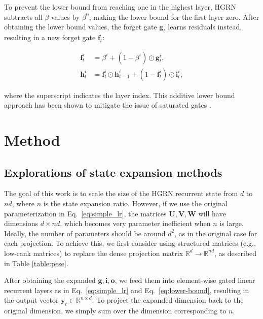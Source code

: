 To prevent the lower bound from reaching one in the highest layer, HGRN subtracts all \(\beta\) values by \(\beta^0\), making the lower bound for the first layer zero. After obtaining the lower bound values, the forget gate \(\mathbf{g}_t\) learns residuals instead, resulting in a new forget gate \(\mathbf{f}_t\):

\begin{equation}
    \begin{aligned}
    \mathbf{f}_t^{i} &=  \beta^{i} + (1 - \beta^i) \odot \mathbf{g}_t^i, \\
    \mathbf{h}_t^{i} &= \mathbf{f}_t^i \odot \mathbf{h}_{t-1}^i + (1 - \mathbf{f}_t^i) \odot \mathbf{i}_t^i,
    \end{aligned}
    \label{eq:lower-bound}
\end{equation}

where the superscript indicates the layer index. This additive lower bound approach has been shown to mitigate the issue of saturated gates \citep{DBLP:conf/icml/GuGP0P20}.

\section{Method}
\subsection{Explorations of state expansion methods}

The goal of this work is to scale the size of the HGRN recurrent state from \(d\) to \(nd\), where \(n\) is the state expansion ratio. However, if we use the original parameterization in Eq.~\ref{eq:simple_lr}, the matrices \(\mathbf{U}, \mathbf{V}, \mathbf{W}\) will have dimensions \(d \times nd\), which becomes very parameter inefficient when \(n\) is large. Ideally, the number of parameters should be around \(d^2\), as in the original case for each projection. To achieve this, we first consider using structured matrices (e.g., low-rank matrices) to replace the dense projection matrix \(\mathbb{R}^{d} \rightarrow \mathbb{R}^{nd}\), as described in Table \ref{table:pese}.

After obtaining the expanded \(\mathbf{g}, \mathbf{i}, \mathbf{o}\), we feed them into element-wise gated linear recurrent layers as in Eq.~\ref{eq:simple_lr} and Eq.~\ref{eq:lower-bound}, resulting in the output vector \(\mathbf{y}_t \in \mathbb{R}^{n \times d}\). To project the expanded dimension back to the original dimension, we simply sum over the dimension corresponding to \(n\).


